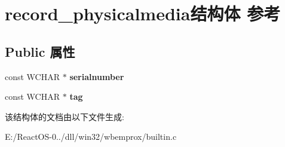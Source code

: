 \hypertarget{structrecord__physicalmedia}{}\section{record\+\_\+physicalmedia结构体 参考}
\label{structrecord__physicalmedia}
\subsection*{Public 属性}
\begin{DoxyCompactItemize}
\item 
\mbox{\label{structrecord__physicalmedia_a85c3ec9faa9a1c7e7ebf337855b35633}} 
const W\+C\+H\+AR $\ast$ {\bfseries serialnumber}
\item 
\mbox{\label{structrecord__physicalmedia_a806b8bd12944155521c8f78593701933}} 
const W\+C\+H\+AR $\ast$ {\bfseries tag}
\end{DoxyCompactItemize}


该结构体的文档由以下文件生成\+:\begin{DoxyCompactItemize}
\item 
E\+:/\+React\+O\+S-\/0../dll/win32/wbemprox/builtin.\+c\end{DoxyCompactItemize}
